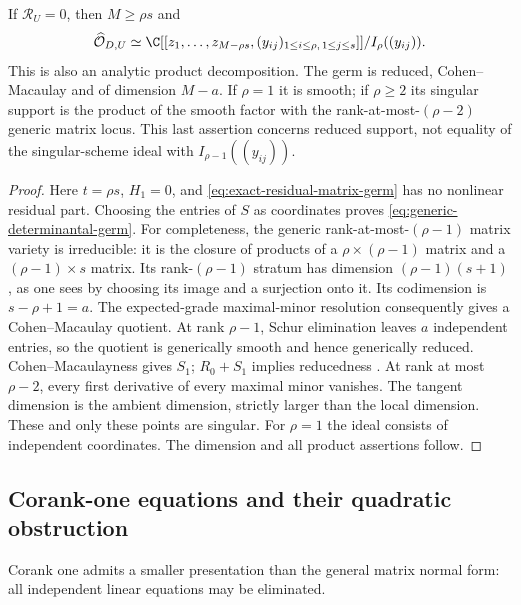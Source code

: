 \begin{corollary}
\label{cor:transverse-determinantal-germ}
If $\mathcal R_U=0$, then $M\ge\rho s$ and
\begin{equation}\label{eq:generic-determinantal-germ}
 \widehat{\mathcal O}_{D,U}\simeq
 \C[[z_1,\ldots,z_{M-\rho s},(y_{ij})_{1\le i\le\rho,\,1\le j\le s}]]
                         /I_\rho((y_{ij})).
\end{equation}
This is also an analytic product decomposition. The germ is reduced,
Cohen--Macaulay and of dimension $M-a$. If $\rho=1$ it is smooth;
if $\rho\ge2$ its singular support is the product of the smooth
factor with the rank-at-most-$(\rho-2)$ generic matrix locus.
This last assertion concerns reduced support, not equality of the
singular-scheme ideal with $I_{\rho-1}((y_{ij}))$.
\end{corollary}
\begin{proof}
Here $t=\rho s$, $H_1=0$, and \eqref{eq:exact-residual-matrix-germ}
has no nonlinear residual part. Choosing the entries of $S$ as
coordinates proves \eqref{eq:generic-determinantal-germ}.
For completeness, the generic rank-at-most-$(\rho-1)$ matrix variety
is irreducible: it is the closure of products of a
$\rho\times(\rho-1)$ matrix and a $(\rho-1)\times s$ matrix.
Its rank-$(\rho-1)$ stratum has dimension
$(\rho-1)(s+1)$, as one sees by choosing its image and a surjection
onto it. Its codimension is $s-\rho+1=a$. The expected-grade
maximal-minor resolution \cite{EN} consequently gives a
Cohen--Macaulay quotient. At rank $\rho-1$, Schur elimination leaves
$a$ independent entries, so the quotient is generically smooth and
hence generically reduced. Cohen--Macaulayness gives $S_1$;
$R_0+S_1$ implies reducedness \cite{Stacks}.
At rank at most $\rho-2$, every first derivative of every maximal
minor vanishes. The tangent dimension is the ambient dimension,
strictly larger than the local dimension. These and only these
points are singular. For $\rho=1$ the ideal consists of independent
coordinates. The dimension and all product assertions follow.
\end{proof}

\subsection{Corank-one equations and their quadratic obstruction}
Corank one admits a smaller presentation than the general matrix
normal form: all independent linear equations may be eliminated.

